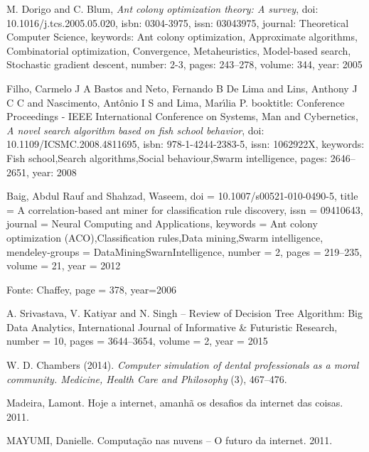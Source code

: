 \documentclass[conference,compsoc]{IEEEtran}
\begin{document}
\begin{thebibliography}{1}
M. Dorigo and C. Blum,
\emph{Ant colony optimization theory: A survey},
doi: {10.1016/j.tcs.2005.05.020},
isbn: {0304-3975},
issn: {03043975},
journal: {Theoretical Computer Science},
keywords: {Ant colony optimization, Approximate algorithms, Combinatorial optimization, Convergence, Metaheuristics, Model-based search, Stochastic gradient descent},
number: {2-3},
pages: {243--278},
volume: {344},
year: {2005}

Filho, Carmelo J A Bastos and Neto, Fernando B De Lima and Lins, Anthony J C C and Nascimento, Ant\^{o}nio I S and Lima, Mar\'{\i}lia P.
booktitle: {Conference Proceedings - IEEE International Conference on Systems, Man and Cybernetics},
\emph{A novel search algorithm based on fish school behavior},
doi: {10.1109/ICSMC.2008.4811695},
isbn: {978-1-4244-2383-5},
issn: {1062922X},
keywords: {Fish school,Search algorithms,Social behaviour,Swarm intelligence},
pages: {2646--2651},
year: {2008}

Baig, Abdul Rauf and Shahzad, Waseem,
doi = {10.1007/s00521-010-0490-5},
title = {{A correlation-based ant miner for classification rule discovery}},
issn = {09410643},
journal = {Neural Computing and Applications},
keywords = {Ant colony optimization (ACO),Classification rules,Data mining,Swarm intelligence},
mendeley-groups = {DataMiningSwarnIntelligence},
number = {2},
pages = {219--235},
volume = {21},
year = {2012}


Fonte: Chaffey,
page = 378,
year=2006


A. Srivastava, V. Katiyar and N. Singh -- Review of Decision Tree Algorithm: Big Data Analytics,
International Journal of Informative \& Futuristic Research,
number = {10},
pages = {3644--3654},
volume = {2},
year = {2015}

W. D. Chambers (2014).
\emph{Computer simulation of dental professionals as a moral community. Medicine, Health Care and Philosophy}
(3), 467–476.




Madeira, Lamont. Hoje a internet, amanhã os desafios da internet das coisas. 2011.

MAYUMI, Danielle. Computação nas nuvens – O futuro da internet. 2011.



\end{thebibliography}






\end{document}
